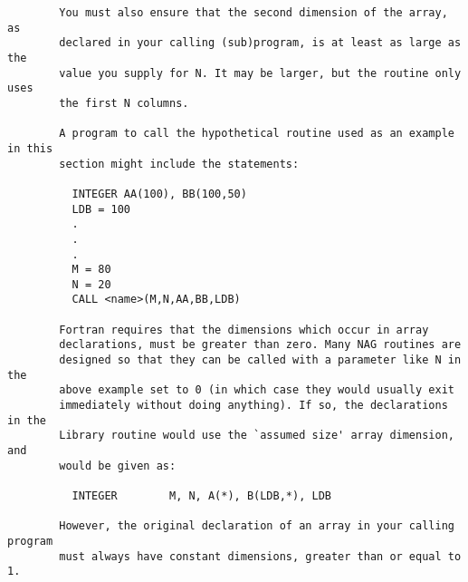 \begin{small}
\begin{verbatim}
        You must also ensure that the second dimension of the array, as           
        declared in your calling (sub)program, is at least as large as the        
        value you supply for N. It may be larger, but the routine only uses       
        the first N columns.                                                      
                                                                                  
        A program to call the hypothetical routine used as an example in this     
        section might include the statements:                                     
                                                                                  
          INTEGER AA(100), BB(100,50)                                             
          LDB = 100                                                               
          .                                                                       
          .                                                                       
          .                                                                       
          M = 80                                                                  
          N = 20                                                                  
          CALL <name>(M,N,AA,BB,LDB)                                              
                                                                                  
        Fortran requires that the dimensions which occur in array                 
        declarations, must be greater than zero. Many NAG routines are            
        designed so that they can be called with a parameter like N in the        
        above example set to 0 (in which case they would usually exit             
        immediately without doing anything). If so, the declarations in the       
        Library routine would use the `assumed size' array dimension, and         
        would be given as:                                                        
                                                                                  
          INTEGER        M, N, A(*), B(LDB,*), LDB                                
                                                                                  
        However, the original declaration of an array in your calling program     
        must always have constant dimensions, greater than or equal to 1.         
                                                                                  

\end{verbatim}
\end{small}
